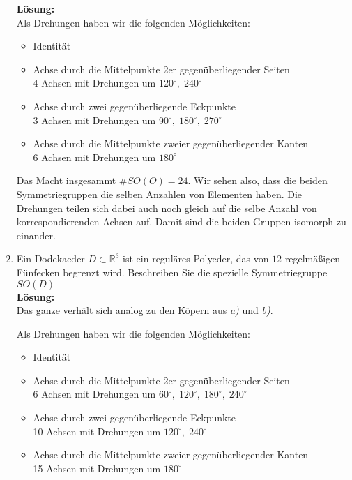 \documentclass[11pt,a4paper,ngerman]{article}
\newcommand{\R}{\mathbb{R}}
\begin{document}
\begin{enumerate}[\bfseries (a)]
\textbf{Lösung:}\\
Als Drehungen haben wir die folgenden Möglichkeiten:
\begin{itemize}
\item Identität
\item Achse durch die Mittelpunkte 2er gegenüberliegender Seiten\\
4 Achsen mit Drehungen um $120^\circ , \; 240^\circ$
\item Achse durch zwei gegenüberliegende Eckpunkte\\
3 Achsen mit Drehungen um $90^\circ , \; 180^\circ , \; 270^\circ$
\item Achse durch die Mittelpunkte zweier gegenüberliegender Kanten\\
6 Achsen mit Drehungen um $180^\circ$
\end{itemize}

Das Macht insgesammt $\# SO(O) = 24$. Wir sehen also, dass die beiden Symmetriegruppen die selben Anzahlen von Elementen haben. Die Drehungen teilen sich dabei auch noch gleich auf die selbe Anzahl von korrespondierenden Achsen auf. Damit sind die beiden Gruppen isomorph zu einander.

\item Ein Dodekaeder $D \subset \R ^3$ ist ein reguläres Polyeder, das von $12$ regelmäßigen Fünfecken begrenzt wird. Beschreiben Sie die spezielle Symmetriegruppe $SO(D)$\\

\textbf{Lösung:}\\
Das ganze verhält sich analog zu den Köpern aus \emph{a)} und \emph{b)}.

Als Drehungen haben wir die folgenden Möglichkeiten:
\begin{itemize}
\item Identität
\item Achse durch die Mittelpunkte 2er gegenüberliegender Seiten\\
6 Achsen mit Drehungen um $60^\circ , \; 120^\circ , \; 180^\circ , \; 240^\circ$
\item Achse durch zwei gegenüberliegende Eckpunkte\\
10 Achsen mit Drehungen um $120^\circ , \; 240^\circ $
\item Achse durch die Mittelpunkte zweier gegenüberliegender Kanten\\
15 Achsen mit Drehungen um $180^\circ$
\end{itemize}


\end{enumerate}
\end{document}

